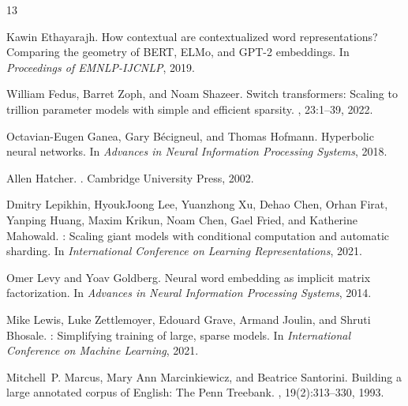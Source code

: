 \documentclass[10pt,twocolumn,letterpaper]{article}
\begin{document}
\begin{thebibliography}{13}

Kawin Ethayarajh.
\newblock How contextual are contextualized word representations? Comparing the geometry of {BERT}, {ELMo}, and {GPT-2} embeddings.
\newblock In {\em Proceedings of EMNLP-IJCNLP}, 2019.

William Fedus, Barret Zoph, and Noam Shazeer.
\newblock Switch transformers: Scaling to trillion parameter models with simple and efficient sparsity.
, 23:1--39, 2022.

Octavian-Eugen Ganea, Gary B{\'e}cigneul, and Thomas Hofmann.
\newblock Hyperbolic neural networks.
\newblock In {\em Advances in Neural Information Processing Systems}, 2018.

Allen Hatcher.
.
\newblock Cambridge University Press, 2002.

Dmitry Lepikhin, HyoukJoong Lee, Yuanzhong Xu, Dehao Chen, Orhan Firat, Yanping Huang, Maxim Krikun, Noam Chen, Gael Fried, and Katherine Mahowald.
: Scaling giant models with conditional computation and automatic sharding.
\newblock In {\em International Conference on Learning Representations}, 2021.

Omer Levy and Yoav Goldberg.
\newblock Neural word embedding as implicit matrix factorization.
\newblock In {\em Advances in Neural Information Processing Systems}, 2014.

Mike Lewis, Luke Zettlemoyer, Edouard Grave, Armand Joulin, and Shruti Bhosale.
: Simplifying training of large, sparse models.
\newblock In {\em International Conference on Machine Learning}, 2021.

Mitchell~P. Marcus, Mary Ann Marcinkiewicz, and Beatrice Santorini.
\newblock Building a large annotated corpus of {English}: The {Penn Treebank}.
, 19(2):313--330, 1993.


\end{thebibliography}
\end{document}
